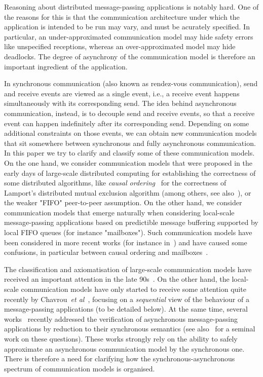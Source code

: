 

Reasoning about distributed message-passing applications is notably hard. One of the reasons for this
is that the communication architecture under which the application is intended to be run may vary, and must be acurately specified. In particular, an under-approximated communication model may hide safety errors
like unspecified receptions, whereas an over-approximated model may hide deadlocks. The degree of asynchrony
of the communication model is therefore an important ingredient of the application.

In synchronous communication (also known as rendez-vous communication), send and receive events are viewed as 
a single event, i.e., a receive event happens simultaneously with its corresponding send. The idea behind asynchronous communication, instead, is to decouple send and receive events, so that a receive event can happen indefinitely after its corresponding send. Depending on some additional constraints on those events, we can obtain new communication models that sit somewhere between synchronous and fully asynchronous communication.
In this paper we try to clarify and classify some of these communication models.
On the one hand, we consider communication models that were proposed in the early days of large-scale distributed computing for establishing the correctness of some distributed algorithms, like \emph{causal ordering}~\cite{Lamport78} for the correctness of Lamport's distributed mutual exclusion algorithm (among others, see also~\cite{Renesse93}), or the weaker "FIFO" peer-to-peer assumption. On the other hand, we consider communication models that emerge
naturally when considering local-scale message-passing applications based on predictible
message buffering supported by local FIFO queues (for instance "mailboxes"). Such communication models have
been considered in more recent works (for instance in~\cite{DBLP:journals/tcs/BasuB16}) and have caused 
some confusions, in particular between causal ordering and mailboxes~\cite{DBLP:conf/cav/BouajjaniEJQ18,DBLP:conf/fossacs/GiustoLL20}. 

The classification and axiomatisation of large-scale communication models have received an important attention in the late 90s~\cite{DBLP:journals/dc/Charron-BostMT96}. On the other hand, the local-scale communication models
have only started to receive some attention quite recently by Chavrou~\emph{et al}~\cite{DBLP:journals/fac/ChevrouHQ16}, focusing on a \emph{sequential} view of the behaviour of a message-passing
applications (to be detailed below). 
At the same time, several works~\cite{KraglQH18,GleissenthallKB19,DBLP:conf/cav/BouajjaniEJQ18,DBLP:conf/cav/LangeY19} recently addressed the verification of 
asynchronous message-passing applications by reduction to their synchronous semantics (see also~\cite{Lipton75} for a seminal work on these questions). These works strongly rely on the ability to safely approximate an asynchronous communication model by the synchronous one. There is therefore a need for clarifying how the synchronous-asynchronous spectrum of communication models is organised.

